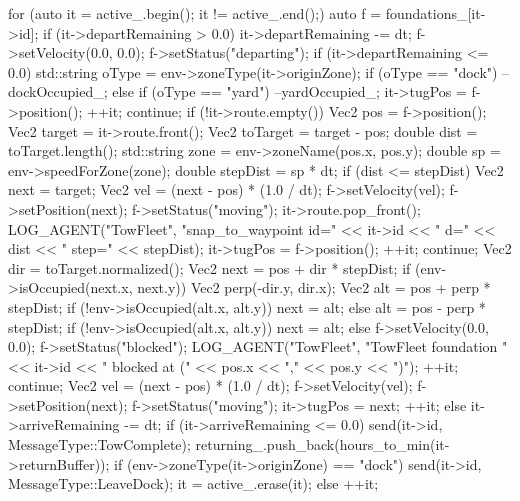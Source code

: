 \documentclass[10pt,letterpaper]{jsarticle}
\begin{document}
\begin{cppcode}
{    for (auto it = active_.begin(); it != active_.end();) {
        auto f = foundations_[it->id];
        if (it->departRemaining > 0.0) {
            it->departRemaining -= dt;
            f->setVelocity({0.0, 0.0});
            f->setStatus("departing");
            if (it->departRemaining <= 0.0) {
                std::string oType = env->zoneType(it->originZone);
                if (oType == "dock") --dockOccupied_;
                else if (oType == "yard") --yardOccupied_;
            }
            it->tugPos = f->position();
            ++it;
            continue;
        }
        if (!it->route.empty()) {
            Vec2 pos = f->position();
            Vec2 target = it->route.front();
            Vec2 toTarget = target - pos;
            double dist = toTarget.length();
            std::string zone = env->zoneName(pos.x, pos.y);
            double sp = env->speedForZone(zone);
            double stepDist = sp * dt;
            if (dist <= stepDist) {
                Vec2 next = target;
                Vec2 vel = (next - pos) * (1.0 / dt);
                f->setVelocity(vel);
                f->setPosition(next);
                f->setStatus("moving");
                it->route.pop_front();
                LOG_AGENT("TowFleet", "snap_to_waypoint id=" << it->id
                          << " d=" << dist << " step=" << stepDist);
                it->tugPos = f->position();
                ++it;
                continue;
            }
            Vec2 dir = toTarget.normalized();
            Vec2 next = pos + dir * stepDist;
            if (env->isOccupied(next.x, next.y)) {
                Vec2 perp(-dir.y, dir.x);
                Vec2 alt = pos + perp * stepDist;
                if (!env->isOccupied(alt.x, alt.y)) {
                    next = alt;
                } else {
                    alt = pos - perp * stepDist;
                    if (!env->isOccupied(alt.x, alt.y)) {
                        next = alt;
                    } else {
                        f->setVelocity({0.0, 0.0});
                        f->setStatus("blocked");
                        LOG_AGENT("TowFleet", "TowFleet foundation " << it->id
                                  << " blocked at (" << pos.x << "," << pos.y << ")");
                        ++it;
                        continue;
                    }
                }
            }
            Vec2 vel = (next - pos) * (1.0 / dt);
            f->setVelocity(vel);
            f->setPosition(next);
            f->setStatus("moving");
            it->tugPos = next;
            ++it;
        } else {
            it->arriveRemaining -= dt;
            if (it->arriveRemaining <= 0.0) {
                send(it->id, MessageType::TowComplete);
                returning_.push_back({hours_to_min(it->returnBuffer)});
                if (env->zoneType(it->originZone) == "dock") {
                    send(it->id, MessageType::LeaveDock);
                }
                it = active_.erase(it);
            } else {
                ++it;
            }
        }
    }
}
\end{cppcode}
\end{document}
